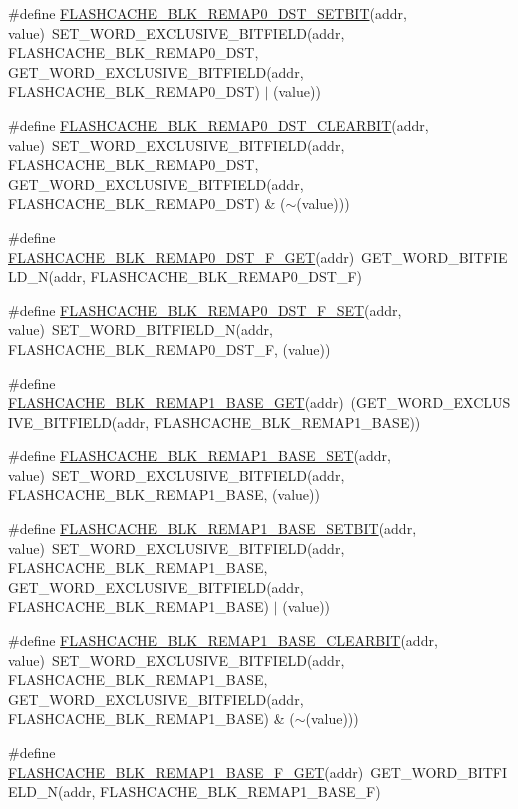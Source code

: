 \begin{DoxyCompactItemize}
\item 
\#define \hyperlink{a00549_aefb219b10da7c2c649462c8acea9c467}{FLASHCACHE\_\-BLK\_\-REMAP0\_\-DST\_\-SETBIT}(addr, value)~SET\_\-WORD\_\-EXCLUSIVE\_\-BITFIELD(addr, FLASHCACHE\_\-BLK\_\-REMAP0\_\-DST, GET\_\-WORD\_\-EXCLUSIVE\_\-BITFIELD(addr, FLASHCACHE\_\-BLK\_\-REMAP0\_\-DST) $|$ (value))
\item 
\#define \hyperlink{a00549_a0c843177342ef8b16eb1983679db16d0}{FLASHCACHE\_\-BLK\_\-REMAP0\_\-DST\_\-CLEARBIT}(addr, value)~SET\_\-WORD\_\-EXCLUSIVE\_\-BITFIELD(addr, FLASHCACHE\_\-BLK\_\-REMAP0\_\-DST, GET\_\-WORD\_\-EXCLUSIVE\_\-BITFIELD(addr, FLASHCACHE\_\-BLK\_\-REMAP0\_\-DST) \& ($\sim$(value)))
\item 
\#define \hyperlink{a00549_a722f528ba8b109c6bdf80eb89fdd914b}{FLASHCACHE\_\-BLK\_\-REMAP0\_\-DST\_\-F\_\-GET}(addr)~GET\_\-WORD\_\-BITFIELD\_\-N(addr, FLASHCACHE\_\-BLK\_\-REMAP0\_\-DST\_\-F)
\item 
\#define \hyperlink{a00549_af5b905a2171b16966aeb8d4034493fb9}{FLASHCACHE\_\-BLK\_\-REMAP0\_\-DST\_\-F\_\-SET}(addr, value)~SET\_\-WORD\_\-BITFIELD\_\-N(addr, FLASHCACHE\_\-BLK\_\-REMAP0\_\-DST\_\-F, (value))
\item 
\#define \hyperlink{a00549_a9e14f38dc38c9a8abeced735f743013f}{FLASHCACHE\_\-BLK\_\-REMAP1\_\-BASE\_\-GET}(addr)~(GET\_\-WORD\_\-EXCLUSIVE\_\-BITFIELD(addr, FLASHCACHE\_\-BLK\_\-REMAP1\_\-BASE))
\item 
\#define \hyperlink{a00549_a95dfb926a27a1430e19e57bea64f957d}{FLASHCACHE\_\-BLK\_\-REMAP1\_\-BASE\_\-SET}(addr, value)~SET\_\-WORD\_\-EXCLUSIVE\_\-BITFIELD(addr, FLASHCACHE\_\-BLK\_\-REMAP1\_\-BASE, (value))
\item 
\#define \hyperlink{a00549_a8913132165ba21a53d857daf0b3cbfff}{FLASHCACHE\_\-BLK\_\-REMAP1\_\-BASE\_\-SETBIT}(addr, value)~SET\_\-WORD\_\-EXCLUSIVE\_\-BITFIELD(addr, FLASHCACHE\_\-BLK\_\-REMAP1\_\-BASE, GET\_\-WORD\_\-EXCLUSIVE\_\-BITFIELD(addr, FLASHCACHE\_\-BLK\_\-REMAP1\_\-BASE) $|$ (value))
\item 
\#define \hyperlink{a00549_abac9cce9e9a00504958db3b927adad9b}{FLASHCACHE\_\-BLK\_\-REMAP1\_\-BASE\_\-CLEARBIT}(addr, value)~SET\_\-WORD\_\-EXCLUSIVE\_\-BITFIELD(addr, FLASHCACHE\_\-BLK\_\-REMAP1\_\-BASE, GET\_\-WORD\_\-EXCLUSIVE\_\-BITFIELD(addr, FLASHCACHE\_\-BLK\_\-REMAP1\_\-BASE) \& ($\sim$(value)))
\item 
\#define \hyperlink{a00549_ad75e3e56bba09fee96720e667b812b64}{FLASHCACHE\_\-BLK\_\-REMAP1\_\-BASE\_\-F\_\-GET}(addr)~GET\_\-WORD\_\-BITFIELD\_\-N(addr, FLASHCACHE\_\-BLK\_\-REMAP1\_\-BASE\_\-F)

\end{DoxyCompactItemize}
